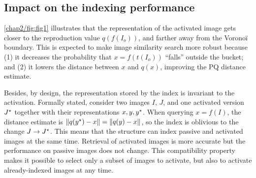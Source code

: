 \subsection{Impact on the indexing performance}

\autoref{chap2/fig:fig1} illustrates that the representation of the activated image gets closer to the reproduction value $q(f(I_o))$, and farther away from the Voronoï boundary.
This is expected to make image similarity search more robust because 
(1) it decreases the probability that $x=f(t(I_o))$ ``falls'' outside the bucket; and
(2) it lowers the distance between $x$ and $q(x)$,  improving the PQ distance estimate.

Besides, by design, the representation stored by the index is invariant to the activation.
Formally stated, consider two images $I$, $J$, and one activated version $J^\star$ together with their representations $x,y,y^\star$. 
When querying $x=f(I)$, the distance estimate is $\lVert{q(y^\star)- x}\rVert = \lVert{q(y)- x}\rVert$, so the index is oblivious to the change $J\rightarrow J^\star$.
This means that the structure can index passive and activated images at the same time.
Retrieval of activated images is more accurate but the performance on passive images does not change. 
This compatibility property makes it possible to select only a subset of images to activate, but also to activate already-indexed images at any time.
